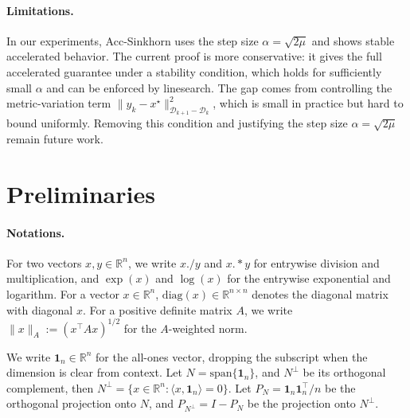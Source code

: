 \documentclass{article}
\theoremstyle{plain}
\theoremstyle{remark}
\begin{document}
\paragraph{Limitations.}
In our experiments, Acc-Sinkhorn uses the step size $\alpha=\sqrt{2\mu}$ and shows stable accelerated behavior. The current proof is more conservative: it gives the full accelerated guarantee under a stability condition, which holds for sufficiently small $\alpha$ and can be enforced by linesearch. The gap comes from controlling the metric-variation term $\|y_k-x^\star\|_{\mathcal D_{k+1}-\mathcal D_k}^2$, which is small in practice but hard to bound uniformly. Removing this condition and justifying the step size $\alpha=\sqrt{2\mu}$ remain future work.


\section{Preliminaries}
\label{sec:prelim}

\paragraph{Notations.}
For two vectors $x,y\in\mathbb{R}^n$, we write $x./y$ and $x.*y$ for entrywise division and multiplication, and $\exp(x)$ and $\log(x)$ for the entrywise exponential and logarithm. For a vector $x\in\mathbb{R}^n$, $\mathrm{diag}(x)\in\mathbb{R}^{n\times n}$ denotes the diagonal matrix with diagonal $x$. For a positive definite matrix $A$, we write $\|x\|_A:=(x^\top A x)^{1/2}$ for the $A$-weighted norm.

We write $\mathbf{1}_n\in\mathbb{R}^n$ for the all-ones vector, dropping the subscript when the dimension is clear from context. Let $N=\mathrm{span}\{\mathbf{1}_n\}$, and $N^\perp$ be its orthogonal complement, then $N^\perp=\{x\in\mathbb{R}^n:\langle x,\mathbf{1}_n\rangle=0\}$. Let $P_N=\mathbf{1}_n\mathbf{1}_n^\top/n$ be the orthogonal projection onto $N$, and $P_{N^\perp}=I-P_N$ be the projection onto $N^\perp$. 

\end{document}
